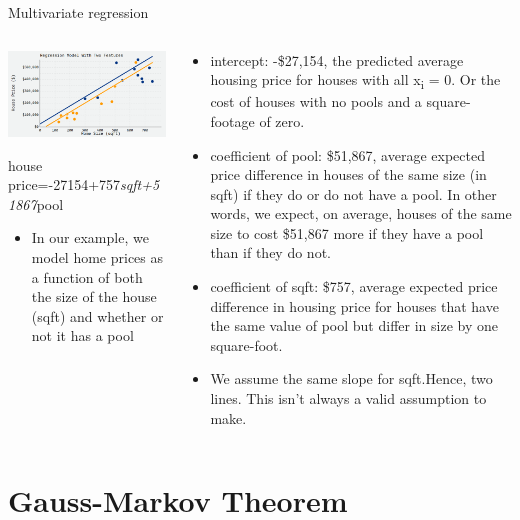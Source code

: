 \documentclass[australian,ignorenonframetext,aspectratio=169]{beamer}
\providecommand{\tightlist}{%
  \setlength{\itemsep}{0pt}\setlength{\parskip}{0pt}}
\begin{document}
\begin{frame}{Multivariate regression}
\protect\hypertarget{multivariate-regression}{}

\begin{columns}[T]
\begin{column}{0.5\textwidth}
\begin{center}\includegraphics[width=1\linewidth]{../graphs/interpret-3} \end{center}

house price=-27154+757\emph{sqft+51867}pool

\begin{itemize}
\tightlist
\item
  In our example, we model home prices as a function of both the size of
  the house (sqft) and whether or not it has a pool
\end{itemize}
\end{column}

\begin{column}{0.5\textwidth}
\tiny

\begin{itemize}
\item
  intercept: -\$27,154, the predicted average housing price for houses
  with all x\textsubscript{i} = 0. Or the cost of houses with no pools
  and a square-footage of zero.
\item
  coefficient of pool: \$51,867, average expected price difference in
  houses of the same size (in sqft) if they do or do not have a pool. In
  other words, we expect, on average, houses of the same size to cost
  \$51,867 more if they have a pool than if they do not.
\item
  coefficient of sqft: \$757, average expected price difference in
  housing price for houses that have the same value of pool but differ
  in size by one square-foot.
\item
  We assume the same slope for sqft.Hence, two lines. This isn't always
  a valid assumption to make.
\end{itemize}
\end{column}
\end{columns}

\section{Gauss-Markov Theorem}

\end{frame}
\end{document}
